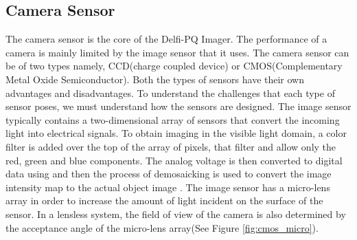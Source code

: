 \subsection{Camera Sensor}
The camera sensor is the core of the Delfi-PQ Imager. The performance of a camera is mainly limited by the image sensor that it uses. The camera sensor can be of two types namely, CCD(charge coupled device) or CMOS(Complementary Metal Oxide Semiconductor). Both the types of sensors have their own advantages and disadvantages. To understand the challenges that each type of sensor poses, we must understand how the sensors are designed. The image sensor typically contains a two-dimensional array of sensors that convert the incoming light into electrical signals. To obtain imaging in the visible light domain, a color filter is added over the top of the array of pixels, that filter and allow only the red, green and blue components. The analog voltage is then converted to digital data using and then the process of demosaicking is used to convert the image intensity map to the actual object image \cite{cmos}. The image sensor has a micro-lens array in order to increase the amount of light incident on the surface of the sensor. In a lensless system, the field of view of the camera is also determined by the acceptance angle of the micro-lens array(See Figure \ref{fig:cmos_micro}).

